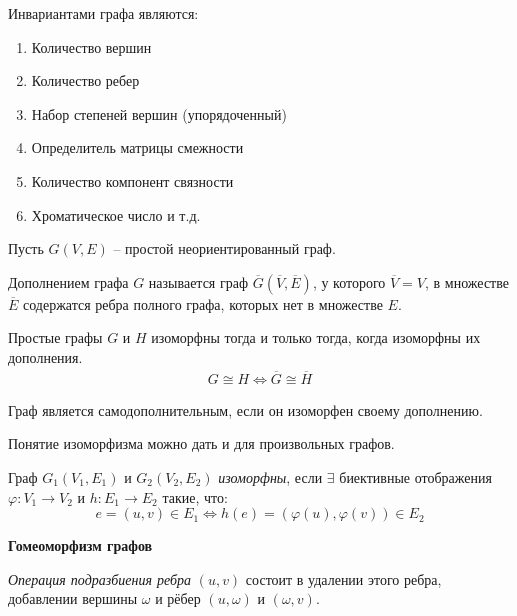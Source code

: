 Инвариантами графа являются:
\begin{enumerate}[left=0.0em, labelsep=1em, topsep=0.0em, itemsep=0pt, parsep=0.5em]
    \item Количество вершин
    \item Количество ребер
    \item Набор степеней вершин (упорядоченный)
    \item Определитель матрицы смежности
    \item Количество компонент связности
    \item Хроматическое число и т.д.
\end{enumerate}

Пусть $G(V,E)$ -- простой неориентированный граф.

\begin{definition}
    Дополнением графа $G$ называется граф $\overline{G}(\overline{V},\overline{E})$,
    у которого $\overline{V}=V$, в множестве $\overline{E}$ содержатся ребра полного графа,
    которых нет в множестве $E$.
\end{definition}

\begin{theorem}
    Простые графы $G$ и $H$ изоморфны тогда и только тогда, когда изоморфны их дополнения.
    \begin{align*}
        G \cong H \Leftrightarrow \overline{G} \cong \overline{H}
    \end{align*}
\end{theorem}

\begin{definition}
    Граф является самодополнительным, если он изоморфен своему дополнению.
\end{definition}

Понятие изоморфизма можно дать и для произвольных графов.

\begin{definition}
    Граф $G_1(V_1,E_1)$ и $G_2(V_2,E_2)$ \textit{изоморфны}, если $\exists$
    биективные отображения $\varphi : V_1 \rightarrow V_2$ и $h: E_1 \rightarrow E_2$
    такие, что:
    $$e = (u,v) \in E_1 \Leftrightarrow h(e) = (\varphi(u),\varphi(v)) \in E_2$$
\end{definition}

\newpage
\textbf{Гомеоморфизм графов}

\begin{definition}
    \textit{Операция подразбиения ребра} $(u, v)$ состоит в удалении этого
    ребра, добавлении вершины $\omega$ и рёбер $(u, \omega)$ и $(\omega, v)$.
\end{definition}

